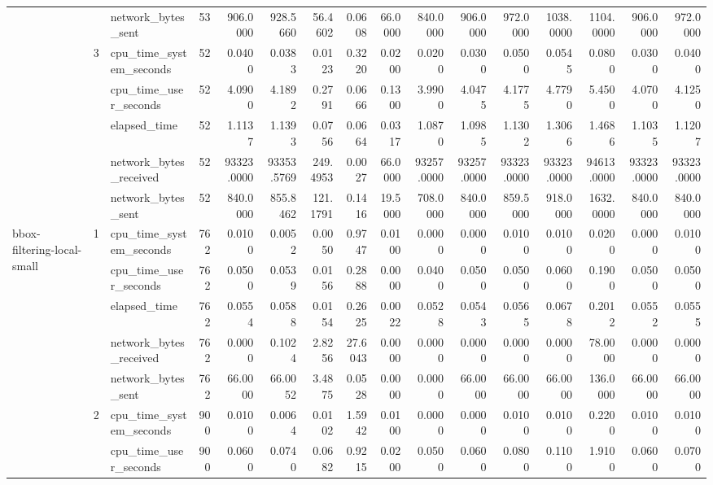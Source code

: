 \begin{tabular}{lllrrrrrrrrrrrrr}
 &  & network\_bytes\_sent & 53 & 906.0000 & 928.5660 & 56.4602 & 0.0608 & 66.0000 & 840.0000 & 906.0000 & 972.0000 & 1038.0000 & 1104.0000 & 906.0000 & 972.0000 \\
\cline{2-16}
 & \multirow[t]{5}{*}{3} & cpu\_time\_system\_seconds & 52 & 0.0400 & 0.0383 & 0.0123 & 0.3220 & 0.0200 & 0.0200 & 0.0300 & 0.0500 & 0.0545 & 0.0800 & 0.0300 & 0.0400 \\
 &  & cpu\_time\_user\_seconds & 52 & 4.0900 & 4.1892 & 0.2791 & 0.0666 & 0.1300 & 3.9900 & 4.0475 & 4.1775 & 4.7790 & 5.4500 & 4.0700 & 4.1250 \\
 &  & elapsed\_time & 52 & 1.1137 & 1.1393 & 0.0756 & 0.0664 & 0.0317 & 1.0870 & 1.0985 & 1.1302 & 1.3066 & 1.4686 & 1.1035 & 1.1207 \\
 &  & network\_bytes\_received & 52 & 93323.0000 & 93353.5769 & 249.4953 & 0.0027 & 66.0000 & 93257.0000 & 93257.0000 & 93323.0000 & 93323.0000 & 94613.0000 & 93323.0000 & 93323.0000 \\
 &  & network\_bytes\_sent & 52 & 840.0000 & 855.8462 & 121.1791 & 0.1416 & 19.5000 & 708.0000 & 840.0000 & 859.5000 & 918.0000 & 1632.0000 & 840.0000 & 840.0000 \\
\cline{1-16} \cline{2-16}
\multirow[t]{15}{*}{bbox-filtering-local-small} & \multirow[t]{5}{*}{1} & cpu\_time\_system\_seconds & 762 & 0.0100 & 0.0052 & 0.0050 & 0.9747 & 0.0100 & 0.0000 & 0.0000 & 0.0100 & 0.0100 & 0.0200 & 0.0000 & 0.0100 \\
 &  & cpu\_time\_user\_seconds & 762 & 0.0500 & 0.0539 & 0.0156 & 0.2888 & 0.0000 & 0.0400 & 0.0500 & 0.0500 & 0.0600 & 0.1900 & 0.0500 & 0.0500 \\
 &  & elapsed\_time & 762 & 0.0554 & 0.0588 & 0.0154 & 0.2625 & 0.0022 & 0.0528 & 0.0543 & 0.0565 & 0.0678 & 0.2012 & 0.0552 & 0.0555 \\
 &  & network\_bytes\_received & 762 & 0.0000 & 0.1024 & 2.8256 & 27.6043 & 0.0000 & 0.0000 & 0.0000 & 0.0000 & 0.0000 & 78.0000 & 0.0000 & 0.0000 \\
 &  & network\_bytes\_sent & 762 & 66.0000 & 66.0052 & 3.4875 & 0.0528 & 0.0000 & 0.0000 & 66.0000 & 66.0000 & 66.0000 & 136.0000 & 66.0000 & 66.0000 \\
\cline{2-16}
 & \multirow[t]{5}{*}{2} & cpu\_time\_system\_seconds & 900 & 0.0100 & 0.0064 & 0.0102 & 1.5942 & 0.0100 & 0.0000 & 0.0000 & 0.0100 & 0.0100 & 0.2200 & 0.0100 & 0.0100 \\
 &  & cpu\_time\_user\_seconds & 900 & 0.0600 & 0.0740 & 0.0682 & 0.9215 & 0.0200 & 0.0500 & 0.0600 & 0.0800 & 0.1100 & 1.9100 & 0.0600 & 0.0700 \\

\end{tabular}
